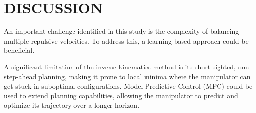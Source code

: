 \documentclass[letterpaper, 10 pt, conference]{ieeeconf}  %
\begin{document}
\section{DISCUSSION}



An important challenge identified in this study is the complexity of balancing multiple repulsive velocities. To address this, a learning-based approach could be beneficial.

%

A significant limitation of the inverse kinematics method is its short-sighted, one-step-ahead planning, making it prone to local minima where the manipulator can get stuck in suboptimal configurations. Model Predictive Control (MPC) could be used to extend planning capabilities, allowing the manipulator to predict and optimize its trajectory over a longer horizon. 

\end{document}
